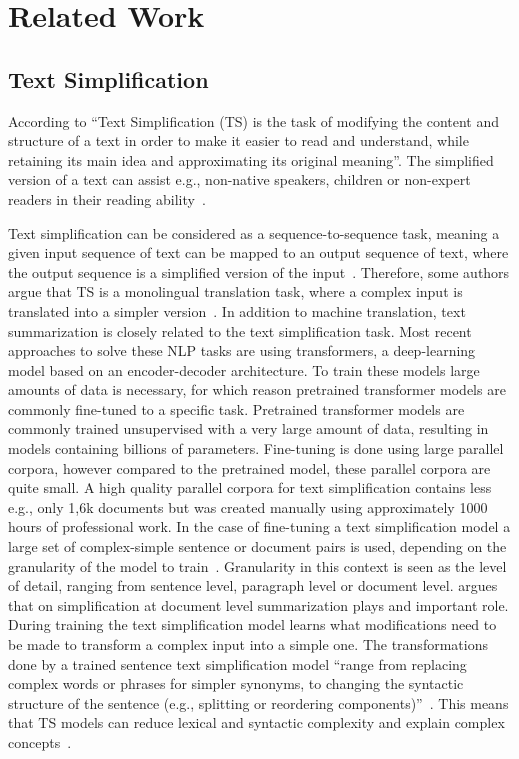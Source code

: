 \section{Related Work}
\subsection{Text Simplification}
According to \citet{AlvaManchego2020} ``Text Simplification (TS) is the task of modifying the content and structure of a text in order to
make it easier to read and understand, while retaining its main idea and approximating its original meaning''.
The simplified version of a text can assist e.g., non-native speakers, children or non-expert readers in their reading ability~\cite{AlvaManchego2020, Jiang2020}.

Text simplification can be considered as a sequence-to-sequence task, meaning a given input sequence of text can be mapped to an
output sequence of text, where the output sequence is a simplified version of the input~\cite{Goldberg2017}.
Therefore, some authors argue that TS is a monolingual translation task, where a complex input is translated into a simpler version~\cite{Aumiller2022}.
In addition to machine translation, text summarization is closely related to the text simplification task.
Most recent approaches to solve these NLP tasks are using transformers, a deep-learning model based on an encoder-decoder architecture.
To train these models large amounts of data is necessary, for which reason pretrained transformer models are commonly fine-tuned to a specific task.
Pretrained transformer models are commonly trained unsupervised with a very large amount of data, resulting in models containing billions of parameters.
Fine-tuning is done using large parallel corpora, however compared to the pretrained model, these parallel corpora are quite small.
A high quality parallel corpora for text simplification contains less e.g., only 1,6k documents but was created manually using approximately 1000 hours of
professional work.
In the case of fine-tuning a text simplification model a large set of complex-simple sentence or document pairs is used,
depending on the granularity of the model to train~\cite{Jurafsky2023}.
Granularity in this context is seen as the level of detail, ranging from sentence level, paragraph level or document level.
\citet{Aumiller2022} argues that on simplification at document level summarization plays and important role.
During training the text simplification model learns what modifications need to be made to transform a complex input into a simple one.
The transformations done by a trained sentence text simplification model ``range from replacing complex words or phrases for simpler synonyms, to changing the
syntactic structure of the sentence (e.g., splitting or reordering components)''~\cite{AlvaManchego2020}. This means that TS models can reduce 
lexical and syntactic complexity and explain complex concepts~\cite{Saeuberli2020}.

